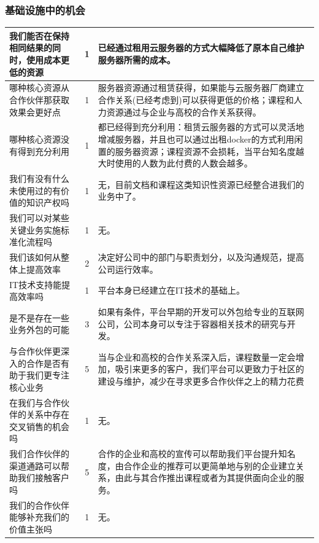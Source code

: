 \documentclass[a4paper]{ctexart}
\begin{document}



\FloatBarrier
\subsubsection{基础设施中的机会}

\begin{table}[h]
  \centering
\begin{tabular}{|p{3.5cm}|c|p{10cm}|}
  \hline
  我们能否在保持相同结果的同时，使用成本更低的资源 & 1 & 已经通过租用云服务器的方式大幅降低了原本自己维护服务器所需的成本。\\
  \hline
  哪种核心资源从合作伙伴那获取效果会更好点 & 1 & 服务器资源通过租赁获得，如果能与云服务器厂商建立合作关系(已经考虑到)可以获得更低的价格；课程和人力资源通过与企业与高校的合作关系获得。\\
  \hline
  哪种核心资源没有得到充分利用 & 1 & 都已经得到充分利用：租赁云服务器的方式可以灵活地增减服务器，并且也可以通过出租docker的方式利用闲置的服务器资源；课程资源不会损耗，当平台知名度越大时使用的人数为此付费的人数会越多。\\
  \hline
  我们有没有什么未使用过的有价值的知识产权吗 & 1 & 无，目前文档和课程这类知识性资源已经整合进我们的业务中了。\\
  \hline
  我们可以对某些关键业务实施标准化流程吗 & 1 & 无。\\
  \hline
  我们该如何从整体上提高效率 & 2 & 决定好公司中的部门与职责划分，以及沟通规范，提高公司运行效率。\\
  \hline
  IT技术支持能提高效率吗 & 1 & 平台本身已经建立在IT技术的基础上。\\
  \hline
  是不是存在一些业务外包的可能 & 3 & 如果有条件，平台早期的开发可以外包给专业的互联网公司，公司本身可以专注于容器相关技术的研究与开发。\\
  \hline
  与合作伙伴更深入的合作是否有助于我们更专注核心业务 & 5 & 当与企业和高校的合作关系深入后，课程数量一定会增加，吸引来更多的客户，我们平台可以更致力于社区的建设与维护，减少在寻求更多合作伙伴之上的精力花费\\
  \hline
  在我们与合作伙伴的关系中存在交叉销售的机会吗 & 1 & 无。\\
  \hline
  我们合作伙伴的渠道通路可以帮助我们接触客户吗 & 5 & 合作的企业和高校的宣传可以帮助我们平台提升知名度，由合作企业的推荐可以更简单地与别的企业建立关系，由此与其合作推出课程或者为其提供面向企业的服务。\\
  \hline
  我们的合作伙伴能够补充我们的价值主张吗 & 1 & 无。\\
  \hline
\end{tabular}
\end{table}
\end{document}
